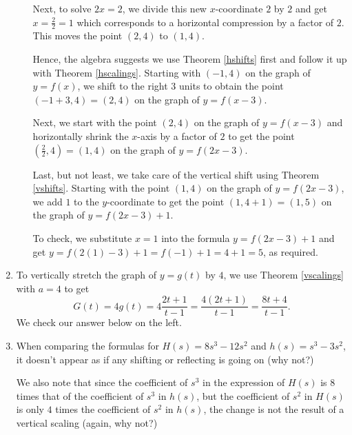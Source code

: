 \begin{ex}
\begin{enumerate}
\begin{enumerate}
 \smallskip
 
 Next, to solve $2x=2$, we divide this new $x$-coordinate $2$  by $2$ and get $x = \frac{2}{2}=1$  which corresponds to a horizontal compression by a factor of $2$.  This moves the point $(2,4)$ to $(1,4)$.  
 
 
 \smallskip
 
 
Hence, the algebra suggests we use Theorem \ref{hshifts} first and follow it up with Theorem \ref{hscalings}.  Starting with $(-1,4)$ on the graph of $y=f(x)$, we shift to the right $3$ units to obtain the point $(-1+3, 4) = (2,4)$ on the graph of $y=f(x-3)$. 

\smallskip

 Next, we start with the point $(2,4)$ on the graph of $y=f(x-3)$ and horizontally shrink the $x$-axis by a factor of $2$ to get the point $\left(\frac{2}{2}, 4\right) = (1,4)$ on the graph of $y=f(2x-3)$. 
 
 \smallskip
 
  Last, but not least, we take care of the vertical shift using Theorem \ref{vshifts}.  Starting with the point $(1,4)$ on the graph of $y=f(2x-3)$, we add $1$ to the $y$-coordinate to get the point  $(1,4+1) = (1,5)$ on the graph of $y = f(2x-3)+1$.   
  
  \smallskip
  
  To check, we substitute $x=1$ into  the formula $y = f(2x-3)+1$ and get $y = f(2(1)-3)+1 = f(-1)+1 = 4+1 = 5$, as required.


 \end{enumerate}
 
 
 \item  To vertically stretch the graph of $y=g(t)$ by $4$, we use Theorem \ref{vscalings} with $a=4$ to get \[G(t) = 4 g(t) = 4 \dfrac{2t+1}{t-1} = \dfrac{4(2t+1)}{t-1} = \dfrac{8t+4}{t-1}.\]  We check our answer below on the left.
   
 \item  When comparing the formulas for $H(s) = 8s^3 - 12s^2$ and $h(s) = s^3-3s^2$, it doesn't appear as if any shifting or reflecting is going on (why not?)   
 
 \smallskip
 
 We also note that since the coefficient of $s^3$ in the expression of $H(s)$ is $8$ times that of the coefficient of $s^3$ in $h(s)$, but the coefficient of $s^2$ in $H(s)$ is only $4$ times the coefficient of $s^2$ in $h(s)$, the change is not the result of a vertical scaling (again, why not?)  
 
 \smallskip
 

\end{enumerate}
\end{ex}
